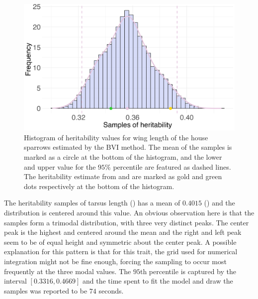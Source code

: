\begin{figure}[H]%
  \centering
  \includegraphics[width=1\linewidth]{Figures/House sparrow study/Heritability_wing.png}
  \caption[Estimated heritability of wing length]{Histogram of heritability values for wing length of the house sparrows estimated by the BVI method. The mean of the samples is marked as a circle at the bottom of the histogram, and the lower and upper value for the $95\%$ percentile are featured as dashed lines. The heritability estimate from \citet{Silva2017} and \citet{Muff2019Genetic} are marked as gold and green dots respectively at the bottom of the histogram.}
  \label{fig:heritability_wing}
\end{figure}
\noindent The heritability samples of tarsus length () has a mean of $0.4015$ () and the distribution is centered around this value. An obvious observation here is that the samples form a trimodal distribution, with three very distinct peaks. The center peak is the highest and centered around the mean and the right and left peak seem to be of equal height and symmetric about the center peak. A possible explanation for this pattern is that for this trait, the grid used for numerical integration might not be fine enough, forcing the sampling to occur most frequently at the three modal values. The $95$th percentile is captured by the interval $[0.3316, 0.4669]$ and the time spent to fit the model and draw the samples was reported to be $74$ seconds.  
